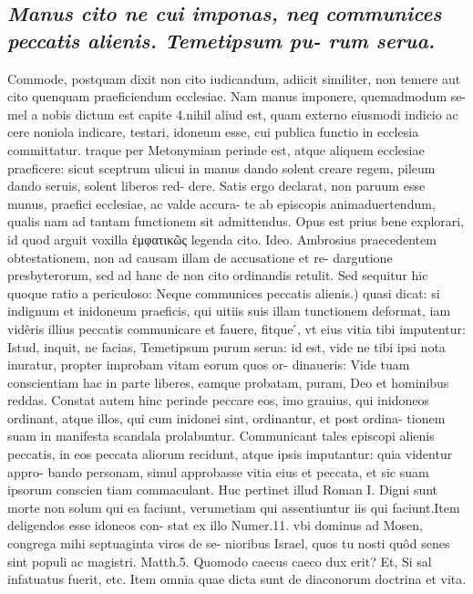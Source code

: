 \documentclass{article}
\begin{document}
\begin{pages}
\subsection*{\textit{Manus cito ne cui imponas, neq communices peccatis alienis. Temetipsum pu- rum serua. }}\pstart Commode, postquam dixit non cito iudicandum, adiicit similiter, non temere aut cito quenquam praeficiendum ecclesiae. Nam manus imponere, quemadmodum se- mel a nobis dictum est capite 4.nihil aliud est, quam externo eiusmodi indicio ac cere noniola indicare, testari, idoneum esse, cui publica functio in ecclesia committatur. traque per Metonymiam perinde est, atque aliquem ecclesiae praeficere: sicut sceptrum ulicui in manus dando solent creare regem, pileum dando seruis, solent liberos red- dere. Satis ergo declarat, non paruum esse munus, praefici ecclesiae, ac valde accura- te ab episcopis animaduertendum, qualis nam ad tantam functionem sit admittendus. Opus est prius bene explorari, id quod arguit voxilla ἐμφατικῶς legenda cito. Ideo. Ambrosius praecedentem obtestationem, non ad causam illam de accusatione et re- dargutione presbyterorum, sed ad hanc de non cito ordinandis retulit. Sed sequitur hic quoque ratio a periculoso:  \pend\pstart Neque communices peccatis alienis.) quasi dicat: si indignum et inidoneum praeficis, qui uitiis suis illam tunctionem deformat, iam vidêris illius peccatis communicare et fauere, fitque ́, vt eius vitia tibi imputentur: Istud, inquit, ne facias, Temetipsum purum serua: id est, vide ne tibi ipsi nota inuratur, propter improbam vitam eorum quos or- dinaueris: Vide tuam conscientiam hac in parte liberes, eamque probatam, puram, Deo et hominibus reddas. Constat autem hinc perinde peccare eos, imo grauius, qui inidoneos ordinant, atque illos, qui cum inidonei sint, ordinantur, et post ordina- tionem suam in manifesta scandala prolabuntur. Communicant tales episcopi alienis peccatis, in eos peccata aliorum recidunt, atque ipsis imputantur: quia videntur appro- bando personam, simul approbasse vitia eius et peccata, et sic suam ipsorum conscien tiam commaculant. Huc pertinet illud Roman I. Digni sunt morte non solum qui ea faciunt, verumetiam qui assentiuntur iis qui faciunt.Item deligendos esse idoneos con- stat ex illo Numer.11. vbi dominus ad Mosen, congrega mihi septuaginta viros de se- nioribus Israel, quos tu nosti quôd senes sint populi ac magistri. Matth.5. Quomodo caecus caeco dux erit? Et, Si sal infatuatus fuerit, etc. Item omnia quae dicta sunt de diaconorum doctrina et vita.  \pend
{}
{}

\end{pages}
\end{document}
